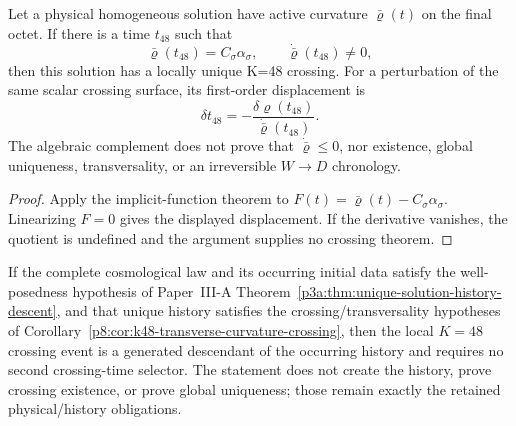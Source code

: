 \documentclass[12pt,a4paper]{article}
\begin{document}
\begin{corollary}
\label{p8:cor:k48-transverse-curvature-crossing}
Let a physical homogeneous solution have active curvature
$\bar\varrho(t)$ on the final octet.  If there is a time $t_{48}$ such that
\begin{equation}
\label{p8:eq:k48-transverse-crossing}
 \bar\varrho(t_{48})=C_\sigma\alpha_\sigma,
 \qquad
 \dot{\bar\varrho}(t_{48})\neq0,
\end{equation}
then this solution has a locally unique K=48 crossing.  For a perturbation of
the same scalar crossing surface, its first-order displacement is
\begin{equation}
\label{p8:eq:k48-crossing-displacement}
 \delta t_{48}
 =-\frac{\delta\varrho(t_{48})}{\dot{\bar\varrho}(t_{48})}.
\end{equation}
The algebraic complement does not prove that
$\dot{\bar\varrho}\leq0$, nor existence, global uniqueness, transversality,
or an irreversible $W\to D$ chronology.
\end{corollary}

\begin{proof}
Apply the implicit-function theorem to
$F(t)=\bar\varrho(t)-C_\sigma\alpha_\sigma$.  Linearizing $F=0$ gives the
displayed displacement.  If the derivative vanishes, the quotient is
undefined and the argument supplies no crossing theorem.
\end{proof}

\begin{corollary}
\label{p8:cor:k48-crossing-history-descendant}
If the complete cosmological law and its occurring initial data satisfy the
well-posedness hypothesis of Paper~III-A
Theorem~\ref{p3a:thm:unique-solution-history-descent}, and that unique history
satisfies the crossing/transversality hypotheses of
Corollary~\ref{p8:cor:k48-transverse-curvature-crossing}, then the local
$K=48$ crossing event is a generated descendant of the occurring history and
requires no second crossing-time selector.  The statement does not create the
history, prove crossing existence, or prove global uniqueness; those remain
exactly the retained physical/history obligations.
\end{corollary}
\end{document}
